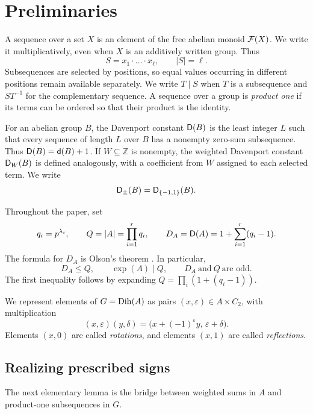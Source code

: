 \section{Preliminaries}\label{sec:preliminaries}

A sequence over a set \(X\) is an element of the free abelian monoid
\(\mathcal F(X)\). We write it multiplicatively, even when \(X\) is an
additively written group. Thus
\[
  S=x_1\cdot\ldots\cdot x_\ell,
  \qquad |S|=\ell.
\]
Subsequences are selected by positions, so equal values occurring in
different positions remain available separately. We write \(T\mid S\)
when \(T\) is a subsequence and \(ST^{-1}\) for the complementary
sequence. A sequence over a group is \emph{product one} if its terms can
be ordered so that their product is the identity.

For an abelian group \(B\), the Davenport constant \(\mathsf D(B)\) is the
least integer \(L\) such that every sequence of length \(L\) over
\(B\) has a nonempty zero-sum subsequence. Thus
\(\mathsf D(B)=\mathsf d(B)+1\). If \(W\subseteq\mathbb Z\) is nonempty, the
weighted Davenport constant \(\mathsf D_W(B)\) is defined analogously, with a
coefficient from \(W\) assigned to each selected term. We write
\[
  \mathsf D_{\pm}(B)=\mathsf D_{\{-1,1\}}(B).
\]

Throughout the paper, set
\[
  q_i=p^{\lambda_i},\qquad
  Q=|A|=\prod_{i=1}^r q_i,
  \qquad
  D_A=\mathsf D(A)=1+\sum_{i=1}^r(q_i-1).
\]
The formula for \(D_A\) is Olson's theorem
\cite{Olson1969}. In particular,
\begin{equation}\label{eq:basic-A-facts}
  D_A\le Q,
  \qquad \exp(A)\mid Q,
  \qquad D_A\ \text{and}\ Q\ \text{are odd}.
\end{equation}
The first inequality follows by expanding
\(Q=\prod_i(1+(q_i-1))\).

We represent elements of \(G=\operatorname{Dih}(A)\) as pairs
\((x,\varepsilon)\in A\times C_2\), with multiplication
\begin{equation}\label{eq:group-law}
  (x,\varepsilon)(y,\delta)
  =\bigl(x+(-1)^\varepsilon y,\,\varepsilon+\delta\bigr).
\end{equation}
Elements \((x,0)\) are called \emph{rotations}, and elements
\((x,1)\) are called \emph{reflections}.

\subsection{Realizing prescribed signs}

The next elementary lemma is the bridge between weighted sums in \(A\)
and product-one subsequences in \(G\).

